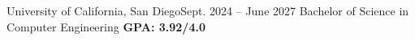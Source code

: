 \resumeSubHeadingListStart
  \resumeSubheading
    {University of California, San Diego}{Sept. 2024 -- June 2027}
    {Bachelor of Science in Computer Engineering}{ \textbf{GPA: 3.92/4.0}}
  \resumeItemListStart
      \vspace{-5pt}
  \resumeItemListEnd
\resumeSubHeadingListEnd